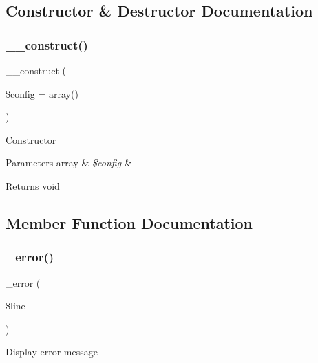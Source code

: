 \subsection{Constructor \& Destructor Documentation}
\mbox{\label{class_c_i___f_t_p_af7f9493844d2d66e924e3c1df51ce616}} 
\subsubsection{\texorpdfstring{\+\_\+\+\_\+construct()}{\_\_construct()}}
{\footnotesize\ttfamily \+\_\+\+\_\+construct (\begin{DoxyParamCaption}\item[{}]{\$config = {\ttfamily array()} }\end{DoxyParamCaption})}

Constructor


\begin{DoxyParams}[1]{Parameters}
array & {\em \$config} & \\
\hline
\end{DoxyParams}
\begin{DoxyReturn}{Returns}
void 
\end{DoxyReturn}


\subsection{Member Function Documentation}
\mbox{\label{class_c_i___f_t_p_ac618e7d56614851d2c54aa096e1bcace}} 
\subsubsection{\texorpdfstring{\+\_\+error()}{\_error()}}
{\footnotesize\ttfamily \+\_\+error (\begin{DoxyParamCaption}\item[{}]{\$line }\end{DoxyParamCaption})\hspace{0.3cm}{\ttfamily [protected]}}

Display error message


